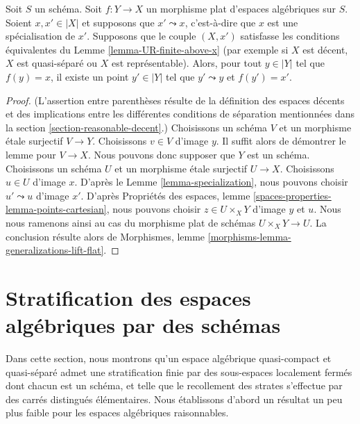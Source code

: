 \begin{lemma}
\label{lemma-generalizations-lift-flat}
Soit $S$ un schéma. Soit $f : Y \to X$ un morphisme plat d'espaces algébriques
sur $S$. Soient $x, x' \in |X|$ et supposons que $x' \leadsto x$, c'est-à-dire
que $x$ est une spécialisation de $x'$. Supposons que le couple $(X, x')$
satisfasse les conditions équivalentes du
Lemme \ref{lemma-UR-finite-above-x} (par exemple si
$X$ est décent, $X$ est quasi-séparé ou $X$ est représentable).
Alors, pour tout $y \in |Y|$ tel que $f(y) = x$, il existe un point
$y' \in |Y|$ tel que $y' \leadsto y$ et $f(y') = x'$.
\end{lemma}

\begin{proof}
(L'assertion entre parenthèses résulte de la définition des espaces décents
et des implications entre les différentes conditions de séparation
mentionnées dans la section \ref{section-reasonable-decent}.)
Choisissons un schéma $V$ et un morphisme étale surjectif $V \to Y$.
Choisissons $v \in V$ d'image $y$. Il suffit alors de démontrer le lemme pour
$V \to X$. Nous pouvons donc supposer que $Y$ est un schéma.
Choisissons un schéma $U$ et un morphisme étale surjectif $U \to X$.
Choisissons $u \in U$ d'image $x$. D'après le
Lemme \ref{lemma-specialization}, nous pouvons choisir $u' \leadsto u$
d'image $x'$. D'après Propriétés des espaces,
lemme \ref{spaces-properties-lemma-points-cartesian},
nous pouvons choisir $z \in U \times_X Y$ d'image $y$ et $u$.
Nous nous ramenons ainsi au cas du morphisme plat de schémas
$U \times_X Y \to U$. La conclusion résulte alors de
Morphismes, lemme \ref{morphisms-lemma-generalizations-lift-flat}.
\end{proof}






\section{Stratification des espaces algébriques par des schémas}
\label{section-stratifications}

\noindent
Dans cette section, nous montrons qu'un espace algébrique quasi-compact et
quasi-séparé admet une stratification finie par des sous-espaces localement
fermés dont chacun est un schéma, et telle que le recollement des strates
s'effectue par des carrés distingués élémentaires. Nous établissons d'abord
un résultat un peu plus faible pour les espaces algébriques raisonnables.

